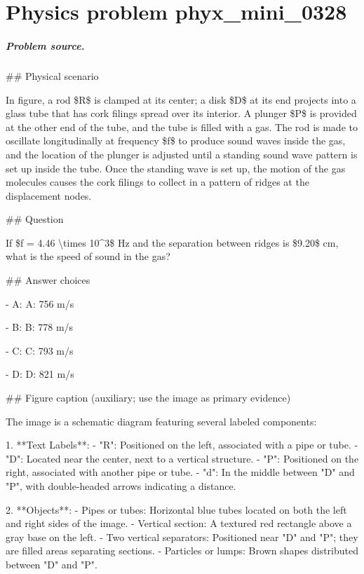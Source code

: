 
\chapter{Physics problem phyx\_mini\_0328}
\label{ch:PhyXMiniProblems_problem_phyx_mini_0328}

\paragraph{Problem source.}
\#\# Physical scenario

In figure, a rod \$R\$ is clamped at its center; a disk \$D\$ at its end projects into a glass tube that has cork filings spread over its interior. A plunger \$P\$ is provided at the other end of the tube, and the tube is filled with a gas. The rod is made to oscillate longitudinally at frequency \$f\$ to produce sound waves inside the gas, and the location of the plunger is adjusted until a standing sound wave pattern is set up inside the tube. Once the standing wave is set up, the motion of the gas molecules causes the cork filings to collect in a pattern of ridges at the displacement nodes.

\#\# Question

If \$f = 4.46 \textbackslash{}times 10\textasciicircum{}3\$ Hz and the separation between ridges is \$9.20\$ cm, what is the speed of sound in the gas?

\#\# Answer choices

- A: A: 756 m/s

- B: B: 778 m/s

- C: C: 793 m/s

- D: D: 821 m/s

\#\# Figure caption (auxiliary; use the image as primary evidence)

The image is a schematic diagram featuring several labeled components:

1. **Text Labels**:
   - "R": Positioned on the left, associated with a pipe or tube.
   - "D": Located near the center, next to a vertical structure.
   - "P": Positioned on the right, associated with another pipe or tube.
   - "d": In the middle between "D" and "P", with double-headed arrows indicating a distance.

2. **Objects**:
   - Pipes or tubes: Horizontal blue tubes located on both the left and right sides of the image.
   - Vertical section: A textured red rectangle above a gray base on the left.
   - Two vertical separators: Positioned near "D" and "P"; they are filled areas separating sections.
   - Particles or lumps: Brown shapes distributed between "D" and "P".

